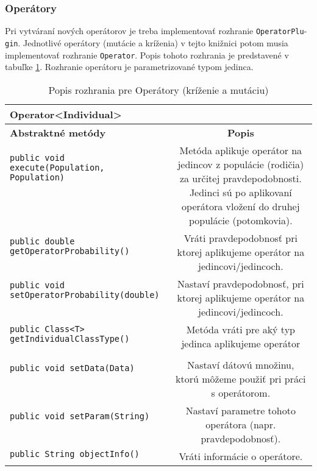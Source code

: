 \subsubsection*{Operátory}
Pri vytváraní nových operátorov je treba implementovať rozhranie \verb|OperatorPlu|- \verb|gin|. Jednotlivé operátory (mutácie a kríženia) v tejto knižnici potom musia implementovať rozhranie \verb|Operator|. Popis tohoto rozhrania je predstavené v tabuľke \ref{fig:tabop}.
Rozhranie operátoru je parametrizované typom jedinca.


\begin{table}
\centering
\begin{tabular}{|l|c|}
\hline
\textbf{Operator<Individual>} & \\
\hline\hline
\textbf{Abstraktné metódy} & \textbf{Popis} \\
\hline
\verb|public void execute(Population, Population)| & \multirow{7}{5cm}{Metóda aplikuje operátor na jedincov z populácie (rodičia) za určitej pravdepodobnosti. Jedinci sú po aplikovaní operátora vložení do druhej populácie (potomkovia). } \\
& \\
& \\
& \\
& \\
& \\
& \\
\hline
\verb|public double getOperatorProbability()| & \multirow{3}{5cm}{Vráti pravdepodobnosť pri ktorej aplikujeme operátor na jedincovi/jedincoch.} \\
& \\
& \\
\hline
\verb|public void setOperatorProbability(double)| & \multirow{4}{5cm}{Nastaví pravdepodobnosť, pri ktorej aplikujeme operátor na jedincovi/jedincoch.} \\
& \\
& \\
& \\
\hline
\verb|public Class<T> getIndividualClassType()| & \multirow{2}{5cm}{Metóda vráti pre aký typ jedinca aplikujeme operátor} \\
& \\
& \\
\hline
\verb|public void setData(Data)| & \multirow{4}{5cm}{Nastaví dátovú množinu, ktorú môžeme použiť pri práci s operátorom.} \\
& \\
& \\
& \\
\hline
\verb|public void setParam(String)| & \multirow{3}{5cm}{Nastaví parametre tohoto operátora (napr. pravdepodobnosť).} \\
& \\
& \\
\hline
\verb|public String objectInfo()| & \multirow{2}{5cm}{Vráti informácie o operátore.} \\
& \\ 
\hline
\end{tabular}
\caption{Popis rozhrania pre Operátory (kríženie a mutáciu)}\label{fig:tabop}
\end{table}

